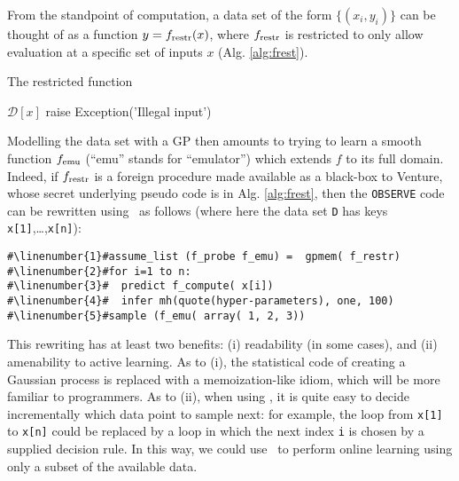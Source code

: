 \label{sec:special-case-gpmem}
From the standpoint of computation, a data set of the form $\{(x_i, y_i)\}$ can be thought of as a function $y = f_{\textrm{restr}}(x)$, where $f_{\textrm{restr}}$ is restricted to only allow evaluation at a specific set of inputs $x$ (Alg. \ref{alg:frest}).

\begin{minipage}{\textwidth}

\begin{algorithm}

The restricted function

\begin{algorithmic}[1]

 \State \Return $\mathcal{D}[x]$
\Else
 \State raise Exception('Illegal input')
\EndIf 
\EndFunction

\end{algorithmic}
  \label{alg:frest}


\end{algorithm}
\end{minipage}
\bigskip

Modelling the data set with a GP then amounts to trying to learn a smooth function $f_{\textrm{emu}}$ (``emu'' stands for ``emulator'') which extends $f$ to its full domain.
Indeed, if $f_{\textrm{restr}}$ is a foreign procedure made available as a black-box to Venture, whose secret underlying pseudo code is in Alg. \ref{alg:frest},
then the \texttt{OBSERVE} code can be rewritten using \gpmem\ as follows (where here the data set \texttt{D} has keys \texttt{x[1]},\ldots,\texttt{x[n]}):
\begin{mdframed}
\begin{minipage}{0.9\linewidth}

\begin{lstlisting}[mathescape,label=alg:venfrest,basicstyle=\selectfont\ttfamily,numbers=none,escapechar=\#]
#\linenumber{1}#assume_list (f_probe f_emu) =  gpmem( f_restr)
#\linenumber{2}#for i=1 to n:
#\linenumber{3}#  predict f_compute( x[i])
#\linenumber{4}#  infer mh(quote(hyper-parameters), one, 100)
#\linenumber{5}#sample (f_emu( array( 1, 2, 3))
\end{lstlisting}
\end{minipage}
\end{mdframed}


\vspace{0.2cm}
This rewriting has at least two benefits: (i) readability (in some cases), and (ii) amenability to active learning.
As to (i), the statistical code of creating a Gaussian process is replaced with a memoization-like idiom, which will be more familiar to programmers.
As to (ii), when using \gpmem, it is quite easy to decide incrementally which data point to sample next: for example, the loop from \texttt{x[1]} to \texttt{x[n]} could be replaced by a loop in which the next index \texttt{i} is chosen by a supplied decision rule.
In this way, we could use \gpmem\ to perform online learning using only a subset of the available data.

